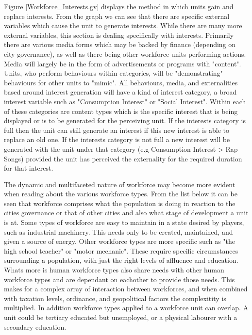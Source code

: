 Figure [Workforce_Interests.gv] displays the method in which units gain and replace interests. From the graph we can see that there are specific external variables which cause the unit to generate interests. While there are many more external variables, this section is dealing specifically with interests. Primarily there are various media forms which may be backed by finance (depending on city governance), as well as there being other workforce units performing actions. Media will largely be in the form of advertisements or programs with "content". Units, who perform behaviours within categories, will be "demonstrating" behaviours for other units to "mimic". All behaviours, media, and externalities based around interest generation will have a kind of interest category, a broad interest variable such as "Consumption Interest" or "Social Interest". Within each of these categories are content types which is the specific interest that is being displayed or is to be generated for the perceiving unit. If the interests category is full then the unit can still generate an interest if this new interest is able to replace an old one. If the interests category is not full a new interest will be generated with the unit under that category (e.g Consumption Interest > Rap Songs) provided the unit has perceived the externality for the required duration for that interest.






The dynamic and multifaceted nature of workforce may become more evident when reading about the various workforce types. From the list below it can be seen that workforce comprises what the population is doing in reaction to the cities governance or that of other cities and also what stage of development a unit is at. Some types of workforce are easy to maintain in a state desired by players, such as industrial machinery. This needs only to be created, maintained, and given a source of energy. Other workforce types are more specific such as "the high school teacher" or "motor mechanic". These require specific circumstances surrounding a population, with just the right levels of affluence and education. Whats more is human workforce types also share needs with other human workforce types and are dependant on eachother to provide those needs. This makes for a complex array of interaction between workforces, and when combined with taxation levels, ordinance, and geopolitical factors the complexitity is multiplied. In addition workforce types applied to a workforce unit can overlap. A unit could be tertiary educated but unemployed, or a physical labourer with a secondary education. 

